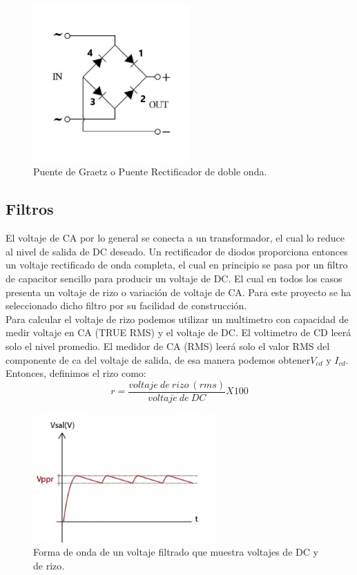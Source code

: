 \begin{figure}[H]
\centering
\includegraphics[width=6cm]{capitulo2/figs/Puente_de_diodos.png}
\caption{Puente de Graetz o Puente Rectificador de doble onda.}
\end{figure}


\subsection{Filtros}
El voltaje de CA por lo general se conecta a un transformador, el cual lo reduce al nivel de salida de DC deseado. Un rectificador de diodos proporciona entonces un voltaje rectificado de onda completa, el cual en principio se pasa por un filtro de capacitor sencillo para producir un voltaje de DC. El cual en todos los casos presenta un voltaje de rizo o variación de voltaje de CA. Para este proyecto se ha seleccionado dicho filtro por su facilidad de construcción. \\

Para calcular el voltaje de rizo podemos utilizar un multimetro con capacidad de medir voltaje en CA (TRUE RMS) y el voltaje de DC. El voltimetro de CD leerá solo el nivel promedio. El medidor de CA (RMS) leerá solo el valor RMS del componente de ca del voltaje de salida, de esa manera podemos obtener$V_{cd}$ y $I_{cd}$. Entonces, definimos el rizo como:\\

\begin{equation}
r=\frac{voltaje\:  de\:  rizo\:  (rms)}{voltaje\:  de\:  DC}X100
\end{equation}

\begin{figure}[H]
\centering
\includegraphics[width=7cm]{capitulo3/figs/risado.png}
\caption{ Forma de onda de un voltaje filtrado que muestra voltajes de DC y de rizo.}
\end{figure}

